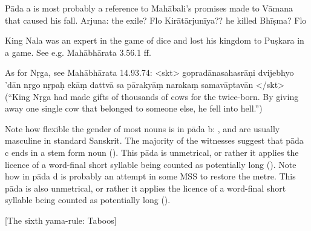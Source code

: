 { Pāda a is most probably a reference to Mahābali's promises made to Vāmana that caused his fall.                  Arjuna: the exile? Flo Kirātārjunīya?? he killed Bhīṣma? Flo    

 King Nala was an expert in the game of dice and lost his kingdom to Puṣkara in                              a game. See e.g. Mahābhārata 3.56.1 ff.                  

                        As for Nṛga, see Mahābhārata 14.93.74: 
                        <skt>                        gopradānasahasrāṇi dvijebhyo 'dān nṛgo nṛpaḥ\danda
                        ekāṃ dattvā sa pārakyāṃ narakaṃ samavāptavān\twodanda
                                                 </skt>                                (``King Nṛga had made gifts of thousands of cows for the twice-born.                                  By giving away one single cow that belonged to someone else,                                   he fell into hell.'')                  }





{ Note how flexible the gender of most nouns is in pāda b:                          ,  and  are usually masculine in standard Sanskrit.  The majority of the witnesses suggest that pāda c ends in a stem form noun ().                 This pāda is unmetrical, or rather it applies the licence of a word-final                 short syllable being counted as potentially long ().   Note how  in pāda d is probably an attempt in some MSS to restore the metre.                 This pāda is also unmetrical, or rather it applies the licence of a word-final                 short syllable being counted as potentially long (). }




\begin{center}
{{[The sixth yama-rule: Taboos]}}
\end{center}









